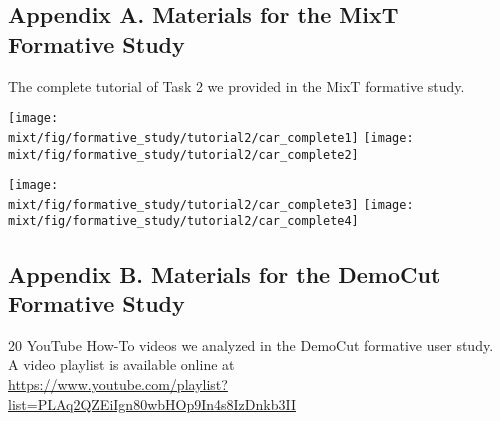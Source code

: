 \begin{appendices}

\setcounter{figure}{0}
\setcounter{table}{0}



\subsection{Appendix A. Materials for the MixT Formative Study}
\label{mixt_formative_tutorial2}

The complete tutorial of Task 2 we provided in the MixT formative study.

\vspace{20pt}
\texttt{[image: \\mixt/fig/formative\_study/tutorial2/car\_complete1]}
\texttt{[image: \\mixt/fig/formative\_study/tutorial2/car\_complete2]}

\clearpage

\texttt{[image: \\mixt/fig/formative\_study/tutorial2/car\_complete3]}
\texttt{[image: \\mixt/fig/formative\_study/tutorial2/car\_complete4]}

\clearpage


\subsection{Appendix B. Materials for the DemoCut Formative Study}
\label{democut_formative}

20 YouTube How-To videos we analyzed in the DemoCut formative user study.\\
A video playlist is available online at\\
\url{https://www.youtube.com/playlist?list=PLAq2QZEiIgn80wbHOp9In4s8IzDnkb3II}


\end{appendices}
